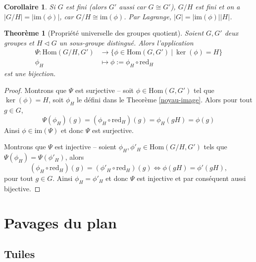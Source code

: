 \documentclass[french]{article}
\theoremstyle{plain}
\newtheorem{thm}{Theorème}[section]
\newtheorem{cor}{Corollaire}[thm]
\theoremstyle{remark}
\theoremstyle{definition}
\newcommand{\Hom}{\mathrm{Hom}}
\newcommand{\red}{\mathrm{red}}
\newcommand{\im}{\mathrm{im}}
\begin{document}
\begin{cor}
	Si $G$ est fini (alors $G'$ aussi car $G \cong G'$), $G/H$ est fini et on a $|G/H| = |\im(\phi)|$, car $G/H \cong \im(\phi)$. Par Lagrange, $|G| = |\im(\phi)||H|$.
\end{cor}


\begin{thm}[Propriété universelle des groupes quotient]
	\label{prop-quotient}
	Soient $G, G'$ deux groupes et $H \triangleleft G$ un sous-groupe distingué.
	Alors l'application
	\begin{align*}
		\Psi : \Hom(G/H, G') &\to \{\phi \in \Hom(G, G')\ |\ \ker(\phi) = H\}\\
		\phi_H &\mapsto \phi := \phi_H \circ \red_H
	\end{align*}
	est une bijection.
\end{thm}

\begin{proof}
	Montrons que $\Psi$ est surjective -- soit $\phi \in \Hom(G, G')$ tel que $\ker(\phi) = H$,
	soit $\phi_H$ le défini dans le Theorème \ref{noyau-image}. Alors pour tout $g \in G$,
	\begin{equation*}
		\Psi(\phi_H)(g) = (\phi_H \circ \red_H) (g) = \phi_H(gH) = \phi(g)
	\end{equation*}
	Ainsi $\phi \in \im(\Psi)$ et donc $\Psi$ est surjective.  

	Montrons que $\Psi$ est injective -- soient $\phi_H, \phi'_H \in \Hom(G/H, G')$ tels que
	$\Psi(\phi_H) = \Psi(\phi'_H)$, alors
	\begin{equation*}
		(\phi_H \circ \red_H)(g) = (\phi'_H \circ \red_H)(g)	
		\iff \phi(gH) = \phi'(gH),
	\end{equation*}
	pour tout $g \in G$. Ainsi $\phi_H = \phi'_H$ et donc $\Psi$ est injective
	et par conséquent aussi bijective.
\end{proof}

%
%

\section{Pavages du plan}

\subsection{Tuiles}
\end{document}
